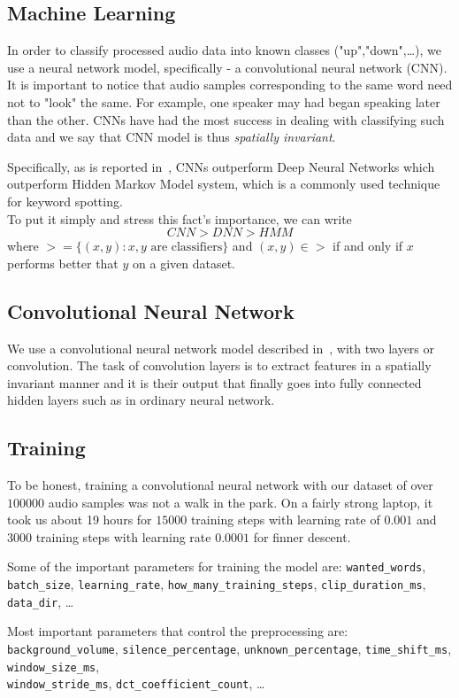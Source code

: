 \documentclass[twoside]{article}
\newcommand{\code}[1]{\texttt{#1}}
\begin{document}
\begin{multicols}{2}
\section{Machine Learning}
In order to classify processed audio data into known classes ("up","down",\ldots), we use a neural network model, specifically - a convolutional neural network (CNN). It is important to notice that audio samples corresponding to the same word need not to "look" the same. For example, one speaker may had began speaking later than the other. CNNs have had the most success in dealing with classifying such data and we say that CNN model is thus \emph{spatially invariant}.

Specifically, as is reported in~\cite{our-conv}, CNNs outperform Deep Neural Networks which outperform Hidden Markov Model system, which is a commonly used technique for keyword spotting.\\
To put it simply and stress this fact's importance, we can write
\[ CNN > DNN > HMM \]
where $> = \{(x,y): x,y \text{ are classifiers}\}$ and $(x,y) \in >$ if and only if $x$ performs better that $y$ on a given dataset.

\subsection{Convolutional Neural Network}
We use a convolutional neural network model described in~\cite{our-conv}, with two layers or convolution. The task of convolution layers is to extract features in a spatially invariant manner and it is their output that finally goes into fully connected hidden layers such as in ordinary neural network.

\subsection{Training}
To be honest, training a convolutional neural network with our dataset of over $100000$ audio samples was not a walk in the park. On a fairly strong laptop, it took us about 19 hours for $15000$ training steps with learning rate of $0.001$ and $3000$ training steps with learning rate $0.0001$ for finner descent.

Some of the important parameters for training the model are: \code{wanted\_words}, \code{batch\_size}, \code{learning\_rate}, \code{how\_many\_training\_steps}, \code{clip\_duration\_ms}, \code{data\_dir}, \ldots

Most important parameters that control the preprocessing are: \code{background\_volume}, \code{silence\_percentage}, \code{unknown\_percentage}, \code{time\_shift\_ms}, \code{window\_size\_ms},\\ \code{window\_stride\_ms}, \code{dct\_coefficient\_count}, \ldots


\end{multicols}
\end{document}
